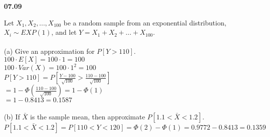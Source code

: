 
{\bf 07.09}

Let $X_1,X_2, ... ,X_{100}$ be a random sample from an exponential distribution, 
$X_i\sim EXP(1)$, and let $Y=X_1+X_2+ ... +X_{100}$.\\
\\(a) Give an approximation for $P[Y>110]$.
\\ $100\cdot E[X]=100\cdot1=100$
\\ $100\cdot Var(X)=100\cdot1^2=100$
\\ $P[Y>110] = P[\frac{Y-100}{\sqrt{100}}>\frac{110-100}{\sqrt{100}}]$
\\ $ = 1-\Phi(\frac{110-100}{\sqrt{100}})=1-\Phi(1)$
\\ $ = 1-0.8413=0.1587$\\
\\(b) If $\bar{X}$ is the sample mean, then approximate $P[1.1<\bar{X}<1.2]$.
\\ $P[1.1<\bar{X}<1.2]=P[110<Y<120]=\Phi(2)-\Phi(1)=0.9772-0.8413=0.1359$\\
\\

